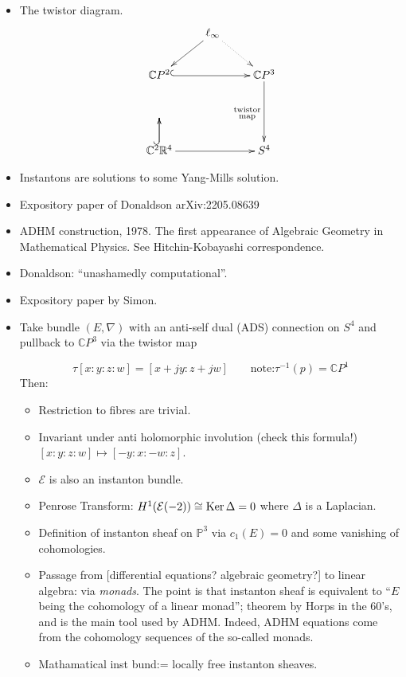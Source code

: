\begin{itemize}
\item The twistor diagram.
$$
\xymatrix{
&  \ell_\infty \ar@{.>}[dr]\ar[dl]\\
\mathbb{C}P^{2} \ar@{^{(}->}[rr]& &
\mathbb{C}P^{3}\ar[dd]
_{\substack{\text{twistor}
\\ \text{map}}}\\ \\
\mathbb{C}^2\ar@{^{(}->}[u]
\mathbb{R}^4 \ar[u]\ar[rr]& &S^4
}
$$

\item Instantons are solutions to some
Yang-Mills solution.
\item Expository paper
of Donaldson arXiv:2205.08639 \item ADHM
construction, 1978. The first appearance of
Algebraic Geometry in Mathematical Physics.
See Hitchin-Kobayashi correspondence.
\item Donaldson: ``unashamedly
computational''.
\item Expository paper by Simon.
\item Take bundle $(E,\nabla)$ with
an anti-self dual
(ADS) connection on $S^4$ and pullback to
$\mathbb{C}P^{3}$ via the twistor map

$$
\tau[x:y:z:w]=[x+jy:z+jw] \qquad \text{note:
$\tau^{-1}(p)=\mathbb{C}P^{1}$}
$$
Then:
\begin{itemize}
\item Restriction to fibres are trivial.
\item Invariant under anti holomorphic
involution (check this formula!)
$[x:y:z:w] \mapsto [-y:x:-w:z]$.
\item $\mathcal{E}$ is also an instanton
bundle.
\item Penrose Transform:
 $H^1(\mathcal{E}(-2)) \cong \mathop{\mathrm{Ker}} \Delta=0$
 where
$\Delta$ is a Laplacian.
\item Definition of instanton sheaf
on $\mathbb{P}^3$ via $c_1(E)=0$ and some
vanishing of cohomologies.
\item Passage from
[differential equations? algebraic geometry?]
to linear algebra: via {\it monads}.
The point is that instanton sheaf is
equivalent to  ``$E$ being the cohomology
of a linear monad''; theorem by Horps
in the 60's, and is the main tool used
by ADHM. Indeed, ADHM equations come from
the cohomology sequences of the so-called
monads.
\item Mathamatical inst bund:=
locally free instanton sheaves.
\end{itemize}
\end{itemize}

